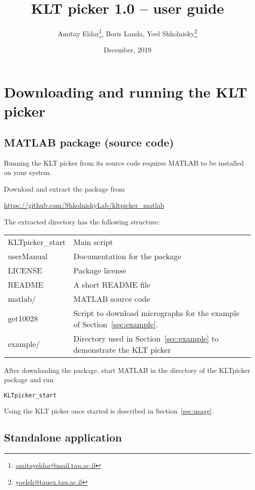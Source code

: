 \documentclass[12pt,a4paper]{article}
\title{KLT picker 1.0 --  user guide}
\author{Amitay Eldar\footnote{\protect\url{amitayeldar@mail.tau.ac.il}}, Boris Landa, Yoel Shkolnisky\footnote{\protect\url{yoelsh@tauex.tau.ac.il}}}
\date{December, 2019}
\begin{document}
\maketitle

\section{Downloading and running the KLT picker}\label{sec:downloading}

\subsection{MATLAB package (source code)}
Running the KLT picker from its source code requires MATLAB to be installed on your system.

\bigskip

Download and extract the package from
\begin{center}
\url{https://github.com/ShkolniskyLab/kltpicker_matlab}
\end{center}

The extracted directory has the following structure:
\begin{center}
\begin{tabular}{lp{}}
\textsf{KLTpicker\_start}  & Main script \\
\textsf{userManual} & Documentation for the package \\
\textsf{LICENSE} & Package license \\
\textsf{README} & A short README file  \\
\textsf{matlab/} & MATLAB source code \\
\textsf{get10028} & Script to download micrographs for the example of Section~\ref{sec:example}. \\
\textsf{example/} & Directory used in Section~\ref{sec:example} to demonstrate the KLT picker
\end{tabular}
\end{center}

After downloading the package, start MATLAB in the directory of the KLTpicker package and run
\begin{center}
\texttt{KLTpicker\_start}
\end{center}

Using the KLT picker once started is described in Section~\ref{sec:usage}.

\subsection{Standalone application}
\end{document}
